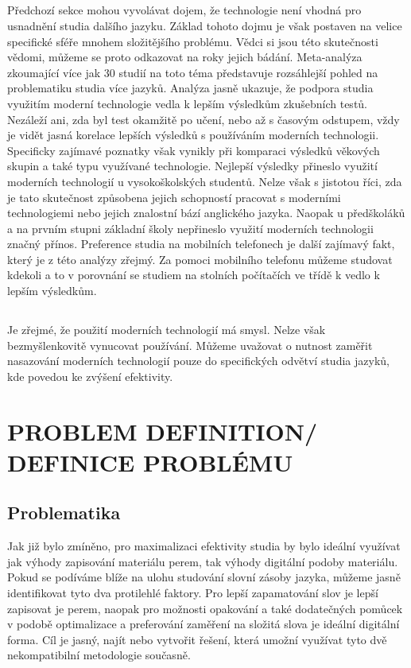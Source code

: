 \documentclass[journal]{IEEEtran}
\begin{document}
\subsection{}
Předchozí sekce mohou vyvolávat dojem, že technologie není vhodná pro usnadnění studia dalšího jazyku. Základ tohoto dojmu je však postaven na velice specifické sféře mnohem složitějšího problému. Vědci si jsou této skutečnosti vědomi, můžeme se proto odkazovat na roky jejich bádání.
Meta-analýza zkoumající více jak 30 studií na toto téma představuje rozsáhlejší pohled na problematiku studia více jazyků\cite{technology_vocab}. Analýza jasně ukazuje, že podpora studia využitím moderní technologie vedla k lepším výsledkům zkušebních testů. Nezáleží ani, zda byl test okamžitě po učení, nebo až s časovým odstupem, vždy je vidět jasná korelace lepších výsledků s používáním moderních technologii. Specificky zajímavé poznatky však vynikly při komparaci výsledků věkových skupin a také typu využívané technologie. Nejlepší výsledky přineslo využití moderních technologií u vysokoškolských studentů.
Nelze však s jistotou říci, zda je tato skutečnost způsobena jejich schopností pracovat s moderními technologiemi nebo jejich znalostní bází anglického jazyka.
Naopak u předškoláků a na prvním stupni základní školy nepřineslo využití moderních technologii značný přínos.
Preference studia na mobilních telefonech je další zajímavý fakt, který je z této analýzy zřejmý.
Za pomoci mobilního telefonu můžeme studovat kdekoli a to v porovnání se studiem na stolních počítačích ve třídě k vedlo k lepším výsledkům.

\subsection{}
Je zřejmé, že použití moderních technologií má smysl.
Nelze však bezmyšlenkovitě vynucovat používání.
Můžeme uvažovat o nutnost zaměřit nasazování moderních technologií pouze do specifických odvětví studia jazyků, kde povedou ke zvýšení efektivity.

\section{PROBLEM DEFINITION/ DEFINICE PROBLÉMU}

\subsection{Problematika}
Jak již bylo zmíněno, pro maximalizaci efektivity studia by bylo ideální využívat jak výhody zapisování materiálu perem, tak výhody digitální podoby materiálu. Pokud se podíváme blíže na ulohu studování slovní zásoby jazyka, můžeme jasně identifikovat tyto dva protilehlé faktory. Pro lepší zapamatování slov je lepší zapisovat je perem, naopak pro možnosti opakování a také dodatečných pomůcek v podobě optimalizace a preferování zaměření na složitá slova je ideální digitální forma. Cíl je jasný, najít nebo vytvořit řešení, která umožní využívat tyto dvě nekompatibilní metodologie současně.
\end{document}
